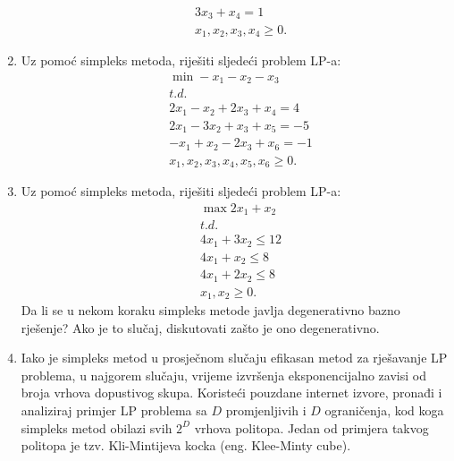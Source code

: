 \documentclass[a4paper, utf8, 11pt, colorlinks]{book}
\theoremstyle{definition}
\begin{document}
\begin{enumerate}
\begin{align*}
   	    & 3 x_3 + x_4 = 1 \\
   	    & x_1, x_2, x_3, x_4 \geq 0.
   \end{align*}
\item  Uz pomoć simpleks metoda, riješiti sljedeći problem LP-a:%
\begin{align*}
    & \min -x_1 - x_2 - x_3 \\
    &  {t.d.} \\
    & 2 x_1 - x_2 + 2 x_3 + x_4 = 4 \\
    & 2x_1 - 3x_2 + x_3 + x_5 =  -5 \\
    & -x_1 + x_2 - 2x_3 + x_6 = -1 \\
    & x_1, x_2, x_3, x_4, x_5, x_6 \geq 0.	
\end{align*}
\item Uz pomoć simpleks metoda, riješiti sljedeći problem LP-a:
\begin{align*}
	 &\max 2x_1 + x_2 \\
	 &   {t.d.} \\
	 &4 x_1 + 3 x_2 \leq 12 \\
	 & 4 x_1 + x_2 \leq 8 \\
	 & 4 x_1 + 2 x_2 \leq 8 \\
	 & x_1, x_2 \geq 0.
\end{align*}
Da li se u nekom koraku simpleks metode javlja degenerativno bazno rješenje? Ako je to slučaj, diskutovati zašto je ono degenerativno. 
\item Iako je simpleks metod u prosječnom slučaju efikasan metod za rješavanje LP problema, u najgorem slučaju, vrijeme izvršenja eksponencijalno zavisi od broja vrhova dopustivog skupa. Koristeći pouzdane internet izvore, pronađi i analiziraj primjer LP problema sa $D$ promjenljivih i $D$ ograničenja, kod koga simpleks metod obilazi svih $2^D$ vrhova politopa. Jedan od primjera takvog politopa je tzv. Kli-Mintijeva kocka (eng. Klee-Minty cube).

\end{enumerate}
\end{document}
